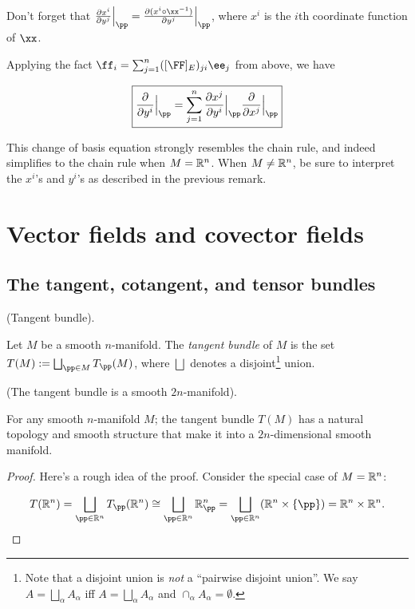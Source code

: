\begin{theorem}
    Don't forget that $\frac{\pd x^i}{\pd y^j}\Big|_\pp = \frac{\pd (x^i \circ \xx^{-1})}{\pd y^j}\Big|_\pp$, where $x^i$ is the $i$th coordinate function of $\xx$.
    
    Applying the fact $\ff_i = \sum_{j = 1}^n ([\FF]_E)_{ji} \ee_j$ from above, we have
    
    \begin{align*}
        \boxed
        {
            \frac{\pd}{\pd y^i}\Big|_\pp
            =
            \sum_{j = 1}^n \frac{\pd x^j}{\pd y^i}\Big|_\pp \frac{\pd}{\pd x^j}\Big|_\pp
        }
    \end{align*}
    
    This change of basis equation strongly resembles the chain rule, and indeed simplifies to the chain rule when $M = \mathbb{R}^n$. When $M \neq \mathbb{R}^n$, be sure to interpret the $x^i$'s and $y^i$'s as described in the previous remark.
\end{theorem}

\section{Vector fields and covector fields}

\subsection*{The tangent, cotangent, and tensor bundles}

\begin{defn}
     (Tangent bundle).
    
    Let $M$ be a smooth $n$-manifold. The \textit{tangent bundle} of $M$ is the set $T(M) := \bigsqcup_{\pp \in M} T_\pp(M)$, where $\bigsqcup$ denotes a disjoint\footnote{Note that a disjoint union is \textit{not} a ``pairwise disjoint union''. We say $A = \bigsqcup_\alpha A_\alpha$ iff $A = \bigsqcup_\alpha A_\alpha$ and $\cap_\alpha A_\alpha = \emptyset$.} union.
\end{defn}

\begin{theorem}
     (The tangent bundle is a smooth $2n$-manifold).
    
    For any smooth $n$-manifold $M$; the tangent bundle $T(M)$ has a natural topology and smooth structure that make it into a $2n$-dimensional smooth manifold.
\end{theorem}

\begin{proof}
    Here's a rough idea of the proof. Consider the special case of $M = \mathbb{R}^n$:
        
    \begin{align*}
        T(\R^n) = \bigsqcup_{\pp \in \R^n} T_\pp(\R^n) \cong \bigsqcup_{\pp \in \R^n} \R^n_\pp = \bigsqcup_{\pp \in \R^n} ( \R^n \times \{\pp\}) = \R^n \times \R^n.
    \end{align*}
\end{proof}

